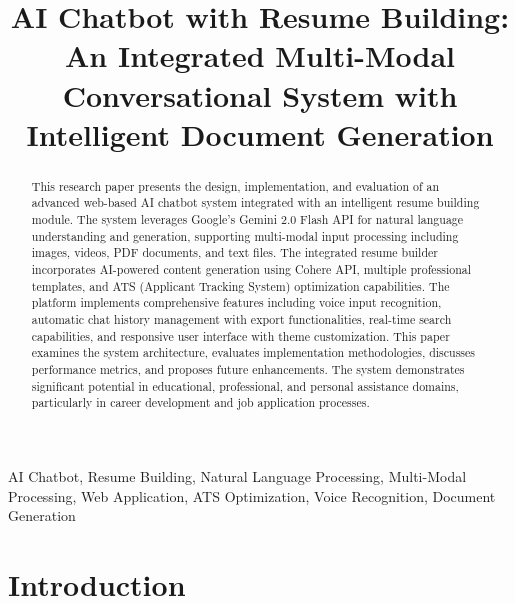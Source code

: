 \documentclass[conference]{IEEEtran}
\begin{document}
\title{AI Chatbot with Resume Building: An Integrated Multi-Modal Conversational System with Intelligent Document Generation}

\author{
}

\maketitle

\begin{abstract}
This research paper presents the design, implementation, and evaluation of an advanced web-based AI chatbot system integrated with an intelligent resume building module. The system leverages Google's Gemini 2.0 Flash API for natural language understanding and generation, supporting multi-modal input processing including images, videos, PDF documents, and text files. The integrated resume builder incorporates AI-powered content generation using Cohere API, multiple professional templates, and ATS (Applicant Tracking System) optimization capabilities. The platform implements comprehensive features including voice input recognition, automatic chat history management with export functionalities, real-time search capabilities, and responsive user interface with theme customization. This paper examines the system architecture, evaluates implementation methodologies, discusses performance metrics, and proposes future enhancements. The system demonstrates significant potential in educational, professional, and personal assistance domains, particularly in career development and job application processes.
\end{abstract}

\begin{IEEEkeywords}
AI Chatbot, Resume Building, Natural Language Processing, Multi-Modal Processing, Web Application, ATS Optimization, Voice Recognition, Document Generation
\end{IEEEkeywords}

\section{Introduction}
\end{document}
